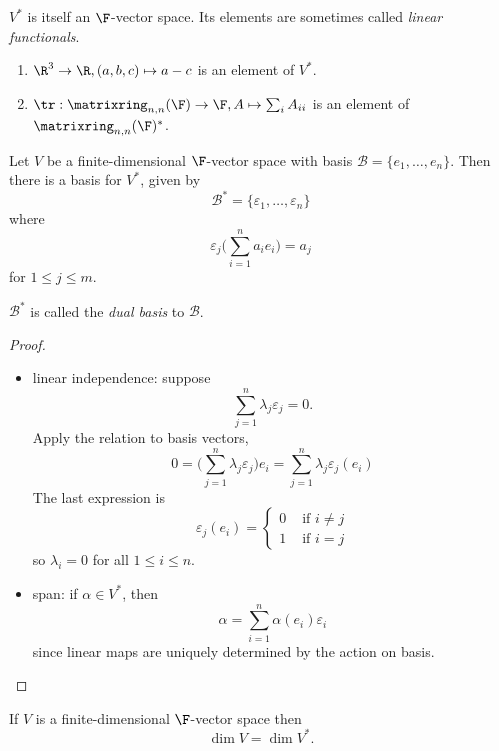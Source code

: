 \documentclass[a4paper]{article}
\newcommand*{\M}{\matrixring}
\newcommand*{\basis}{\mathcal}
\theoremstyle{definition}
\begin{document}
\(V^*\) is itself an \(\F\)-vector space. Its elements are sometimes called \emph{linear functionals}.

\begin{eg}\leavevmode
  \begin{enumerate}
  \item \(\R^3 \to \R, (a,b,c)\mapsto a-c\) is an element of \(V^*\).
  \item \(\tr: \M_{n,n}(\F)\to \F, A\mapsto \sum_i A_{ii}\) is an element of \(\M_{n,n}(\F)^*\).
  \end{enumerate}
\end{eg}

\begin{lemma}
  Let \(V\) be a finite-dimensional \(\F\)-vector space with basis \(\basis B = \{e_1,\dots,e_n\}\). Then there is a basis for \(V^*\), given by
  \[
    \basis B^* = \{\varepsilon_1,\dots, \varepsilon_n\}
  \]
  where
  \[
    \varepsilon_j \Big( \sum_{i=1}^{n} a_i e_i \Big) = a_j
  \]
  for \(1\leq j\leq m\).

  \(\basis B^*\) is called the \emph{dual basis} to \(\basis B\).
\end{lemma}

\begin{proof}\leavevmode
  \begin{itemize}
  \item linear independence: suppose
    \[
      \sum_{j=1}^{n}\lambda_j\varepsilon_j = 0.
    \]
    Apply the relation to basis vectors,
    \[
      0 = \Big( \sum_{j=1}^n \lambda_j\varepsilon_j \Big) e_i = \sum_{j=1}^n \lambda_j\varepsilon_j(e_i)
      \]
      The last expression is 
      \[
        \varepsilon_j(e_i) = 
      \begin{cases}
        0 & \text{ if } i \neq j \\
        1 & \text{ if } i = j
      \end{cases}
    \]
    so \(\lambda_i=0\) for all \(1 \leq i \leq n\).
  \item span: if \(\alpha \in V^*\), then
    \[
      \alpha = \sum_{i=1}^{n}\alpha(e_i)\varepsilon_i
    \]
    since linear maps are uniquely determined by the action on basis.
  \end{itemize}
\end{proof}

\begin{corollary}
  If \(V\) is a finite-dimensional \(\F\)-vector space then
  \[
    \dim V = \dim V^*.
  \]
\end{corollary}
\end{document}
